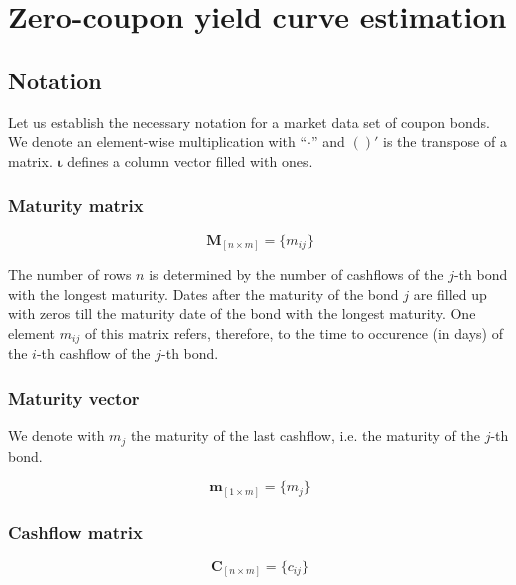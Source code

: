 \section{Zero-coupon yield curve estimation}

\subsection{Notation}
\label{sec:notation}

Let us establish the necessary notation for a market data set of coupon bonds. We denote an element-wise multiplication with ``$\cdot$'' and $( )'$ is the transpose of a matrix. $\bm{\iota}$ defines a column vector filled with ones.

\subsubsection*{Maturity matrix}

\begin{equation*}\label{maturitym}
\bm{M}_{\left[n\times m\right]}= \{m_{ij}\}
\end{equation*}

The number of rows $n$ is determined by the number of cashflows of the $j$-th bond with the longest maturity. Dates after the maturity of the bond $j$ are filled up with zeros till the maturity date of the bond with the longest maturity. One element $m_{ij}$ of this matrix refers, therefore, to the time to occurence (in days) of the $i$-th cashflow of the $j$-th bond. 

\subsubsection*{Maturity vector}

We denote with $m_j$ the maturity of the last cashflow, i.e. the maturity of the $j$-th bond.

\begin{equation*}\label{weights}
    \bm{m}_{\left[1\times m\right]}= \{m_j\}
\end{equation*}

\subsubsection*{Cashflow matrix}


 \begin{equation*}\label{cashflowm}
\bm{C}_{\left[n\times m\right]}= \{c_{ij}\}
\end{equation*}

